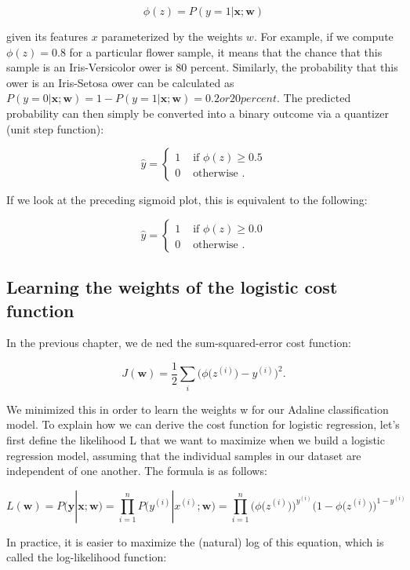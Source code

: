 \documentclass{report}
\begin{document}
\[
\phi(z) = P(y=1 | \mathbf{x}; \mathbf{w})
\]

given its features $x$ parameterized by the weights $w$. For example, if we compute $\phi(z) = 0.8$ for a particular flower sample, it means that the chance that this sample is an Iris-Versicolor  ower is 80 percent. Similarly, the probability that this  ower is an Iris-Setosa  ower can be calculated as $P(y=0 | \mathbf{x};\mathbf{w})=1 - P (y=1 | \mathbf{x}; \mathbf{w}) = 0.2 or 20 percent.$ The predicted probability can then simply be converted into a binary outcome via a quantizer (unit step function):

\[ \hat{y}= \begin{cases} 
      1 & \text{ if } \phi(z) \ge 0.5 \\
      0 & \text{ otherwise }.
   \end{cases}
\]

If we look at the preceding sigmoid plot, this is equivalent to the following:

\[ \hat{y}= \begin{cases} 
      1 & \text{ if } \phi(z) \ge 0.0 \\
      0 & \text{ otherwise }.
   \end{cases}
\]

\subsection{Learning the weights of the logistic cost function}

In the previous chapter, we de ned the sum-squared-error cost function: 

\[
J(\mathbf{w}) = \frac{1}{2} \sum_i \bigg( \phi \big( z^{(i)} \big) - y^{(i)}  \bigg)^2.
\]

We minimized this in order to learn the weights w for our Adaline classification model. To explain how we can derive the cost function for logistic regression, let's  first define the likelihood L that we want to maximize when we build a logistic regression model, assuming that the individual samples in our dataset are independent of one another. The formula is as follows:

\[
L(\mathbf{w}) = P(\mathbf{y} | \mathbf{x}; \mathbf{w}) = \prod_{i=1}^{n} P \big( y^{(i)} | x^{(i)}; \mathbf{w} \big) =  \prod_{i=1}^{n} \bigg( \phi \big(z^{(i)} \big) \bigg) ^ {y^{(i)}} \bigg( 1 - \phi \big( z^{(i)} \big) \bigg)^{1-y^{(i)}}
\]

In practice, it is easier to maximize the (natural) log of this equation, which is called
the log-likelihood function:
\end{document}
